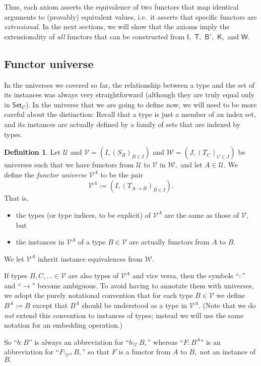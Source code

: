 \documentclass[a4paper]{article}
\theoremstyle{definition}
\newtheorem{definition}{Definition}[section]
\theoremstyle{remark}
\newcommand{\defn}{\emph}
\newcommand{\C}{\mathcal{C}}
\newcommand{\U}{\mathcal{U}}
\newcommand{\V}{\mathcal{V}}
\newcommand{\W}{\mathcal{W}}
\newcommand{\nm}{\mathsf}
\newcommand{\universe}{\nm}
\newcommand{\Set}{\universe{Set}}
\newcommand{\combinator}{\nm}
\newcommand{\idFun}{\combinator{I}}
\newcommand{\revAppFun}{\combinator{T}}
\newcommand{\constFun}{\combinator{K}}
\newcommand{\compFun}{\combinator{B'}}
\newcommand{\dupFun}{\combinator{W}}
\begin{document}
Thus, each axiom asserts the equivalence of two functors that map identical arguments to
(provably) equivalent values, i.e.\ it asserts that specific functors are
\defn{extensional}.
In the next sections, we will show that the axioms imply the extensionality of \emph{all}
functors that can be constructed from $\idFun,$ $\revAppFun,$ $\compFun,$ $\constFun,$ and
$\dupFun$.

\subsection{Functor universe}
\label{sec:functor-universe}

In the universes we covered so far, the relationship between a type and the set of its
instances was always very straightforward (although they are truly equal only in $\Set_\C$).
In the universe that we are going to define now, we will need to be more careful about the
distinction: Recall that a type is just a member of an index set, and its instances are
actually defined by a family of sets that are indexed by types.

\begin{definition}
  Let $\U$ and $\V = (I, (S_B)_{B \in I})$ and $\W = (J, (T_C)_{C \in J})$ be universes
  such that we have functors from $\U$ to $\V$ in $\W,$ and let $A \in \U.$
  We define the \defn{functor universe} $\V^A$ to be the pair
  \[\V^A := (I, (T_{A \to B})_{B \in I}).\]
  That is,
  \begin{itemize}
    \item the types (or type indices, to be explicit) of $\V^A$ are the same as those of
    $\V,$ but
    \item the instances in $\V^A$ of a type $B \in \V$ are actually functors from $A$ to $B.$
  \end{itemize}
  We let $\V^A$ inherit instance equivalences from $\W.$
\end{definition}

If types $B,C,\ldots \in \V$ are also types of $\V^A$ and vice versa, then the symbols
``$:$'' and ``$\to$'' become ambiguous. To avoid having to annotate them with universes, we
adopt the purely notational convention that for each type $B \in \V$ we define $B^A := B$
except that $B^A$ should be understood as a type in $\V^A.$ (Note that we do \emph{not}
extend this convention to instances of types; instead we will use the same notation for an
embedding operation.)

So ``$b : B$'' is always an abbreviation for ``$b :_\V B,$'' whereas ``$F : B^A$'' is an
abbreviation for ``$F :_{\V^A} B,$'' so that $F$ is a functor from $A$ to $B,$ not an
instance of $B.$
\end{document}
